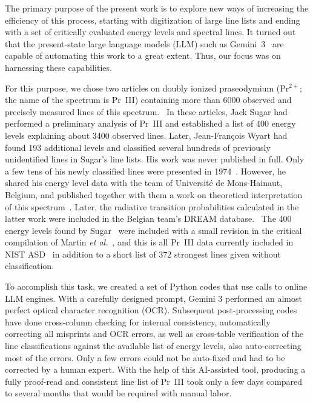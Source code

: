 \documentclass[10pt]{article}
\begin{document}
The primary purpose of the present work is to explore new ways of increasing the efficiency of this process, starting with digitization of large line lists and ending with a set of critically evaluated energy levels and spectral lines. It turned out that the present-state large language models (LLM) such as Gemini~3~\cite{Gemini3} are capable of automating this work to a great extent. Thus, our focus was on harnessing these capabilities.

For this purpose, we chose two articles on doubly ionized praseodymium (Pr$^{2+}$; the name of the spectrum is Pr~III) containing more than 6000 observed and precisely measured lines of this spectrum.~\cite{Sugar1969,Sugar1974} In these articles, Jack Sugar had performed a preliminary analysis of Pr~III and established a list of 400 energy levels explaining about 3400 observed lines. Later, Jean-Fran{\c c}ois Wyart had found 193 additional levels and classified several hundreds of previously unidentified lines in Sugar's line lists. His work was never published in full. Only a few tens of his newly classified lines were presented in 1974~\cite{Wyart1974}. However, he shared his energy level data with the team of Universit\'e de Mons-Hainaut, Belgium, and published together with them a work on theoretical interpretation of this spectrum~\cite{Palmeri2000}. Later, the radiative transition probabilities calculated in the latter work were included in the Belgian team's DREAM database.~\cite{Biemont2005, DREAM} The 400 energy levels found by Sugar~\cite{Sugar1969,Sugar1974} were included with a small revision in the critical compilation of Martin \textit{et al.}~\cite{Martin1978}, and this is all Pr~III data currently included in NIST ASD~\cite{NIST_ASD} in addition to a short list of 372 strongest lines given without classification.

To accomplish this task, we created a set of Python codes that use calls to online LLM engines. With a carefully designed prompt, Gemini 3 performed an almost perfect optical character recognition (OCR). Subsequent post-processing codes have done cross-column checking for internal consistency, automatically correcting all misprints and OCR errors, as well as cross-table verification of the line classifications against the available list of energy levels, also auto-correcting most of the errors. Only a few errors could not be auto-fixed and had to be corrected by a human expert. With the help of this AI-assisted tool, producing a fully proof-read and consistent line list of Pr~III took only a few days compared to several months that would be required with manual labor.
\end{document}
